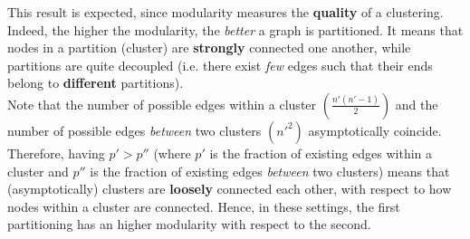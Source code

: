 \medskip
\noindent This result is expected, since modularity measures the \textbf{quality} of a clustering. Indeed, the higher the modularity, the \textit{better} a graph is partitioned. It means that nodes in a partition (cluster) are \textbf{strongly} connected one another, while partitions are quite decoupled (i.e. there exist \textit{few} edges such that their ends belong to \textbf{different} partitions).\\
Note that the number of possible edges within a cluster $\left( \frac{n'(n'-1)}{2} \right)$ and the number of possible edges \textit{between} two clusters $\left( n'^2 \right)$ asymptotically coincide. Therefore, having $p' > p''$ (where $p'$ is the fraction of existing edges within a cluster and $p''$ is the fraction of existing edges \textit{between} two clusters) means that (asymptotically) clusters are \textbf{loosely} connected each other, with respect to how nodes within a cluster are connected. Hence, in these settings, the first partitioning has an higher modularity with respect to the second.
